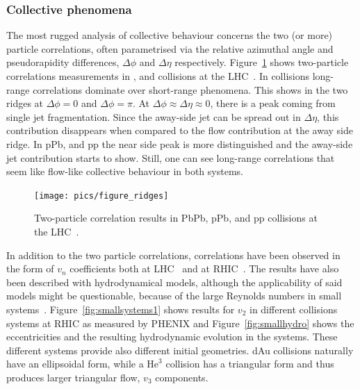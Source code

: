 
\subsubsection{Collective phenomena}
The most rugged analysis of collective behaviour concerns the two (or more) particle correlations, often parametrised via the relative azimuthal angle and pseudorapidity differences, $\Delta \phi$ and $\Delta \eta$ respectively. Figure~\ref{fig:smallsystems2} shows two-particle correlations measurements in \PbPb, \pPb and \pp collisions at the LHC~\cite{Aad:2015gqa}. In \PbPb collisions long-range correlations dominate over short-range phenomena. This shows in the two ridges at $\Delta \phi = 0 $ and $\Delta \phi = \pi$. At $\Delta\phi\approx\Delta\eta\approx0$, there is a peak coming from single jet fragmentation. Since the away-side jet can be spread out in $\Delta\eta$, this contribution disappears when compared to the flow contribution at the away side ridge. In pPb, and pp the near side peak is more distinguished and the away-side jet contribution starts to show. Still, one can see long-range correlations that seem like flow-like collective behaviour in both systems. 
\begin{figure}[b!]
\centering
            	\texttt{[image: pics/figure\_ridges]}
                \caption{Two-particle correlation results in PbPb, pPb, and pp collisions at the LHC~\cite{Aad:2015gqa}. }
	\label{fig:smallsystems2}
\end{figure}

In addition to the two particle correlations, correlations have been observed in the form of $v_n$ coefficients both at LHC~\cite{Acharya:2017ino} and at RHIC~\cite{Aidala:2016vgl}. The results have also been described  with hydrodynamical models, although the applicability of said models might be questionable, because of the large Reynolds numbers in small systems~\cite{Shen:2016zpp,Niemi:2014wta}. Figure~\ref{fig:smallsystems1} shows results for $v_2$ in different collisions systems at RHIC as measured by PHENIX and Figure~\ref{fig:smallhydro} shows the eccentricities and the resulting hydrodynamic evolution in the systems. These different systems provide also different initial geometries. dAu collisions naturally have an ellipsoidal form, while a $\mathrm{He}^3$ collision has a triangular form and thus produces larger triangular flow, $v_3$ components. 

